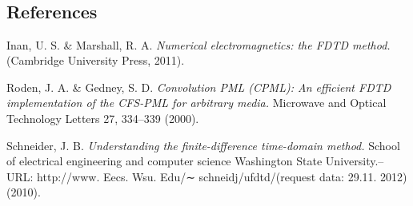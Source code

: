 \documentclass{article}
\begin{document}
    \begin{center}
    \end{center}
    { \hspace*{\fill} \\}
    
    \begin{center}
    \end{center}
    { \hspace*{\fill} \\}
    
    \begin{center}
    \end{center}
    { \hspace*{\fill} \\}
    
    \begin{center}
    \end{center}
    { \hspace*{\fill} \\}

    \subsection*{References}\label{references}

Inan, U. S. \& Marshall, R. A. \emph{Numerical electromagnetics: the
FDTD method.} (Cambridge University Press, 2011).

Roden, J. A. \& Gedney, S. D. \emph{Convolution PML (CPML): An efficient
FDTD implementation of the CFS-PML for arbitrary media.} Microwave and
Optical Technology Letters 27, 334--339 (2000).

Schneider, J. B. \emph{Understanding the finite-difference time-domain
method.} School of electrical engineering and computer science
Washington State University.--URL: http://www. Eecs. Wsu. Edu/∼
schneidj/ufdtd/(request data: 29.11. 2012) (2010).


    
    
    
    
\end{document}
